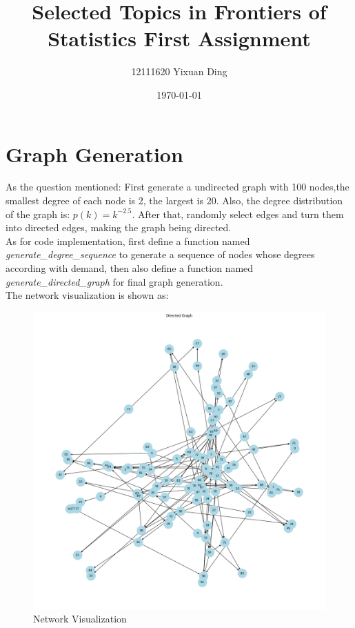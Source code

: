 \documentclass{article}
\begin{document}
	
	\title{Selected Topics in Frontiers of Statistics First Assignment}
	\author{12111620 Yixuan Ding}
	\date{\today}
	
	\maketitle
	\section*{Graph Generation}
	As the question mentioned: First generate a undirected graph with 100 nodes,the smallest degree of each node is 2, the largest is 20. Also, the degree distribution of the graph is: $p(k) = k^{-2.5}$. After that, randomly select edges and turn them into directed edges, making the graph being directed.\\
	As for code implementation, first define a function named \textit{generate\_degree\_sequence} to generate a sequence of nodes whose degrees according with demand, then also define a function named \textit{generate\_directed\_graph} for final graph generation.\\
	The network visualization is shown as:
	\begin{figure}[H]
		\centering
		\includegraphics[scale=0.32]{network.png}
		\caption{Network Visualization}
	\end{figure}
	
\end{document}
